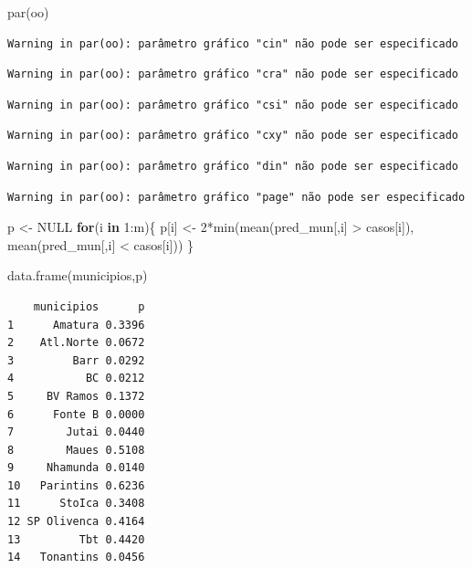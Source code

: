 \documentclass[
  letterpaper,
  DIV=11,
  numbers=noendperiod]{scrreprt}
\newenvironment{Shaded}{\begin{snugshade}}{\end{snugshade}}
\newcommand{\ConstantTok}[1]{\textcolor[rgb]{0.56,0.35,0.01}{#1}}
\newcommand{\ControlFlowTok}[1]{\textcolor[rgb]{0.00,0.23,0.31}{\textbf{#1}}}
\newcommand{\DecValTok}[1]{\textcolor[rgb]{0.68,0.00,0.00}{#1}}
\newcommand{\FunctionTok}[1]{\textcolor[rgb]{0.28,0.35,0.67}{#1}}
\newcommand{\NormalTok}[1]{\textcolor[rgb]{0.00,0.23,0.31}{#1}}
\newcommand{\OtherTok}[1]{\textcolor[rgb]{0.00,0.23,0.31}{#1}}
\newcommand{\SpecialCharTok}[1]{\textcolor[rgb]{0.37,0.37,0.37}{#1}}
\theoremstyle{definition}
\theoremstyle{definition}
\theoremstyle{plain}
\theoremstyle{remark}
\begin{document}
\begin{Shaded}
\begin{Highlighting}[]
\FunctionTok{par}\NormalTok{(oo)}
\end{Highlighting}
\end{Shaded}

\begin{verbatim}
Warning in par(oo): parâmetro gráfico "cin" não pode ser especificado
\end{verbatim}

\begin{verbatim}
Warning in par(oo): parâmetro gráfico "cra" não pode ser especificado
\end{verbatim}

\begin{verbatim}
Warning in par(oo): parâmetro gráfico "csi" não pode ser especificado
\end{verbatim}

\begin{verbatim}
Warning in par(oo): parâmetro gráfico "cxy" não pode ser especificado
\end{verbatim}

\begin{verbatim}
Warning in par(oo): parâmetro gráfico "din" não pode ser especificado
\end{verbatim}

\begin{verbatim}
Warning in par(oo): parâmetro gráfico "page" não pode ser especificado
\end{verbatim}

\begin{Shaded}
\begin{Highlighting}[]
\NormalTok{p }\OtherTok{\textless{}{-}} \ConstantTok{NULL}
\ControlFlowTok{for}\NormalTok{(i }\ControlFlowTok{in} \DecValTok{1}\SpecialCharTok{:}\NormalTok{m)\{}
\NormalTok{p[i] }\OtherTok{\textless{}{-}} \DecValTok{2}\SpecialCharTok{*}\FunctionTok{min}\NormalTok{(}\FunctionTok{mean}\NormalTok{(pred\_mun[,i] }\SpecialCharTok{\textgreater{}}\NormalTok{ casos[i]),}
\FunctionTok{mean}\NormalTok{(pred\_mun[,i] }\SpecialCharTok{\textless{}}\NormalTok{ casos[i]))}
\NormalTok{\}}

\FunctionTok{data.frame}\NormalTok{(municipios,p)}
\end{Highlighting}
\end{Shaded}

\begin{verbatim}
    municipios      p
1      Amatura 0.3396
2    Atl.Norte 0.0672
3         Barr 0.0292
4           BC 0.0212
5     BV Ramos 0.1372
6      Fonte B 0.0000
7        Jutai 0.0440
8        Maues 0.5108
9     Nhamunda 0.0140
10   Parintins 0.6236
11      StoIca 0.3408
12 SP Olivenca 0.4164
13         Tbt 0.4420
14   Tonantins 0.0456
\end{verbatim}
\end{document}
